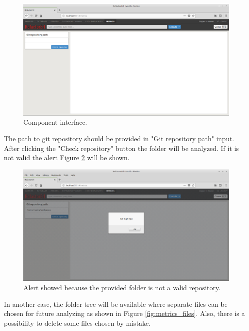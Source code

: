 \begin{figure}[ht]
	\includegraphics[width=\textwidth]{figures/metrics.png}
	\caption{Component interface.}
	\label{fig:interface}
\end{figure}

The path to git repository should be provided in "Git repository path" input. After clicking the "Check repository" button the folder will be analyzed. If it is not valid the alert Figure \ref{fig:metrics_alert} will be shown.  

\begin{figure}[ht]
	\includegraphics[width=\textwidth]{figures/alert.png}
	\caption{Alert showed because the provided folder is not a valid repository.}
	\label{fig:metrics_alert}
\end{figure}

In another case, the folder tree will be available where separate files can be chosen for future analyzing as shown in Figure \ref{fig:metrics_files}. Also, there is a possibility to delete some files chosen by mistake.

